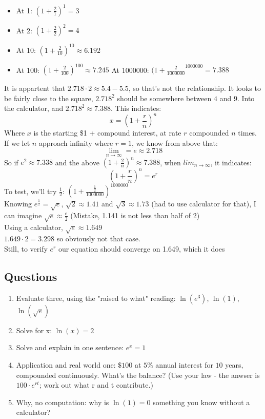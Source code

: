 \documentclass{article}
\begin{document}
\begin{itemize}
  \item At 1: $(1 + \frac{2}{1})^1 = 3$
  \item At 2: $(1 + \frac{2}{2})^{2} = 4$
  \item At 10: $(1 + \frac{2}{10})^{10} \approx 6.192$
  \item At 100: $(1 + \frac{2}{100})^{100} \approx 7.245$
    At 1000000: $(1 + \frac{2}{1000000}^{1000000} = 7.388$
\end{itemize}
It is appartent that $2.718 \cdot 2 \approx 5.4-5.5$, so that's not the relationship.
It looks to be fairly close to the square, $2.718^{2}$ should be somewhere between $4$ and $9$.
Into the calculator, and $2.718^{2} \approx 7.388$. This indicates:
\[
  x = \left(1 + \frac{r}{n}\right)^{n}
\]
Where $x$ is the starting \$1 + compound interest, at rate $r$ compounded $n$ times. 
If we let $n$ approach infinity where $r = 1$, we know from above that:
\[
  \lim_{n\to\infty} = e \approx 2.718
\]
So if $e^{2} \approx 7.338$ and the above $(1 + \frac{2}{n})^{n} \approx 7.388$, when $lim_{n\to\infty}$, it indicates:
\[
  \left(1 + \frac{r}{n}\right)^{n} = e^{r}
\]
To test, we'll try $\frac{1}{2}$: $(1 + \frac{\frac{1}{2}}{1000000})^{1000000}$ \\
Knowing $e^{\frac{1}{2}} = \sqrt{e}$, $\sqrt{2} \approx 1.41$ and $\sqrt{3} \approx 1.73$ (had to use calculator for that), 
I can imagine $\sqrt{e} \approx \frac{e}{2}$ (Mistake, 1.141 is not less than half of 2) \\
Using a calculator, $\sqrt{e} \approx 1.649$ \\
$1.649 \cdot 2 = 3.298$ so obviously not that case. \\
Still, to verify $e^{r}$ our equation should converge on 1.649, which it does

\subsection{Questions}
\begin{enumerate}
  \item Evaluate three, using the "raised to what" reading: $\ln(e^{3})$, $\ln(1)$, $\ln(\sqrt e)$
  \item Solve for x: $\ln(x) = 2$
  \item Solve and explain in one sentence: $e^{x} = 1$
  \item Application and real world one: $\$100$ at $5\%$ annual interest for $10$ years, compounded continuously. 
    What's the balance? (Use your law - the anwser is $100 \cdot e^{rt}$; work out what r and t contribute.)
  \item Why, no computation: why is $\ln(1) = 0$ something you know without a calculator?
\end{enumerate}
\end{document}
